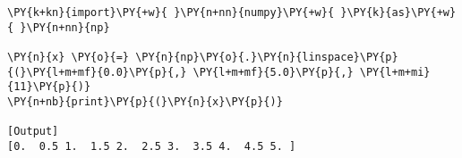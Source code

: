 \begin{Verbatim}[label=\makebox{\href{https://github.com/unipi-physics-labs/lab1-notes/tree/main/snippy/np.linspace.py}{https://github.com/.../np.linspace.py}},commandchars=\\\{\}]
\PY{k+kn}{import}\PY{+w}{ }\PY{n+nn}{numpy}\PY{+w}{ }\PY{k}{as}\PY{+w}{ }\PY{n+nn}{np}

\PY{n}{x} \PY{o}{=} \PY{n}{np}\PY{o}{.}\PY{n}{linspace}\PY{p}{(}\PY{l+m+mf}{0.0}\PY{p}{,} \PY{l+m+mf}{5.0}\PY{p}{,} \PY{l+m+mi}{11}\PY{p}{)}
\PY{n+nb}{print}\PY{p}{(}\PY{n}{x}\PY{p}{)}

[Output]
[0.  0.5 1.  1.5 2.  2.5 3.  3.5 4.  4.5 5. ]
\end{Verbatim}
